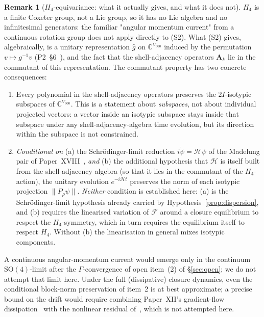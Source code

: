 \documentclass[11pt]{article}
\theoremstyle{definition}
\newtheorem{remark}[theorem]{Remark}
\newcommand{\C}{\mathbb{C}}
\newcommand{\Fcal}{\mathcal{F}}
\newcommand{\Hcal}{\mathcal{H}}
\begin{document}
\begin{remark}[$H_4$-equivariance: what it actually gives, and what it does not]\label{rem:h4}
$H_4$ is a finite Coxeter group, not a Lie group, so it has no Lie algebra and no infinitesimal generators: the familiar "angular momentum current" from a continuous rotation group does not apply directly to (S2). What (S2) gives, algebraically, is a unitary representation $\widehat g$ on $\C^{V_{600}}$ induced by the permutation $v \mapsto g^{-1} v$ (P2~\S 6~\citep{CascadeAlgSubstrate}), and the fact that the shell-adjacency operators $\mathbf{A}_k$ lie in the commutant of this representation. The commutant property has two concrete consequences:
\begin{enumerate}
    \item Every polynomial in the shell-adjacency operators preserves the $2I$-isotypic subspaces of $\C^{V_{600}}$. This is a statement about \emph{subspaces}, not about individual projected vectors: a vector inside an isotypic subspace stays inside that subspace under any shell-adjacency-algebra time evolution, but its direction within the subspace is not constrained.
    \item \emph{Conditional on} (a) the Schr\"{o}dinger-limit reduction $i\dot\psi = \Hcal\psi$ of the Madelung pair of Paper~XVIII~\citep{SmartXVIII}, \emph{and} (b) the additional hypothesis that $\Hcal$ is itself built from the shell-adjacency algebra (so that it lies in the commutant of the $H_4$-action), the unitary evolution $e^{-i\Hcal t}$ preserves the norm of each isotypic projection $\|P_\rho \psi\|$. \emph{Neither} condition is established here: (a) is the Schr\"{o}dinger-limit hypothesis already carried by Hypothesis~\ref{prop:dispersion}, and (b) requires the linearised variation of $\Fcal$ around a closure equilibrium to respect the $H_4$-symmetry, which in turn requires the equilibrium itself to respect $H_4$. Without (b) the linearisation in general mixes isotypic components.
\end{enumerate}
A continuous angular-momentum current would emerge only in the continuum $\mathrm{SO}(4)$-limit after the $\Gamma$-convergence of open item~(2) of \S\ref{sec:open}; we do not attempt that limit here. Under the full (dissipative) closure dynamics, even the conditional block-norm preservation of item~2 is at best approximate; a precise bound on the drift would require combining Paper~XII's gradient-flow dissipation~\citep{SmartXII} with the nonlinear residual of~\citep{SmartXIX}, which is not attempted here.
\end{remark}
\end{document}
